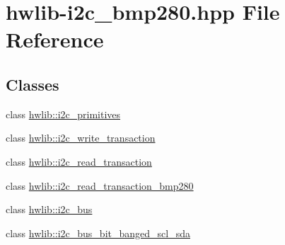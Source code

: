 \hypertarget{hwlib-i2c__bmp280_8hpp}{}\section{hwlib-\/i2c\+\_\+bmp280.hpp File Reference}
\label{hwlib-i2c__bmp280_8hpp}
\subsection*{Classes}
\begin{DoxyCompactItemize}
\item 
class \mbox{\hyperlink{classhwlib_1_1i2c__primitives}{hwlib\+::i2c\+\_\+primitives}}
\item 
class \mbox{\hyperlink{classhwlib_1_1i2c__write__transaction}{hwlib\+::i2c\+\_\+write\+\_\+transaction}}
\item 
class \mbox{\hyperlink{classhwlib_1_1i2c__read__transaction}{hwlib\+::i2c\+\_\+read\+\_\+transaction}}
\item 
class \mbox{\hyperlink{classhwlib_1_1i2c__read__transaction__bmp280}{hwlib\+::i2c\+\_\+read\+\_\+transaction\+\_\+bmp280}}
\item 
class \mbox{\hyperlink{classhwlib_1_1i2c__bus}{hwlib\+::i2c\+\_\+bus}}
\item 
class \mbox{\hyperlink{classhwlib_1_1i2c__bus__bit__banged__scl__sda}{hwlib\+::i2c\+\_\+bus\+\_\+bit\+\_\+banged\+\_\+scl\+\_\+sda}}
\end{DoxyCompactItemize}
